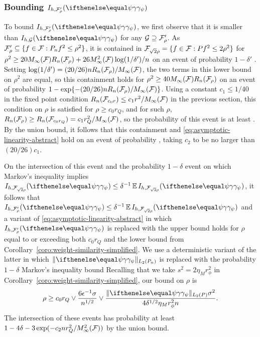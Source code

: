 \subsubsection{Bounding $I_{h,\F_{\rho}'}(\riesz[\psi])$} 
\label{sec:bounding-I}

To bound $I_{h,\F'_{\rho}}(\riesz[\psi])$, we first observe that it is smaller than $I_{h,\GG}(\riesz[\psi])$ 
for any $\mathcal{G} \supseteq \mathcal{F}'_{\rho}$. As $\F'_{\rho} \subseteq \set{ f \in \F : \Pn f^2 \le \rho^2}$, 
it is contained in $\F_{\sqrt{2}\rho} = \set{ f \in \F : \P f^2 \le 2\rho^2}$ 
for $\rho^2 \ge 20M_{\infty}(\mathcal{F})R_n(\mathcal{F}_{\rho}) + 26M_{\infty}^2(\mathcal{F})\log(1/\delta')/n$ on an event of probability $1-\delta'$ \citep[Lemma 3.6]{bartlett2005local}.
Setting $\log(1/\delta') = (20/26)nR_n(\mathcal{F}_{\rho})/M_{\infty}(\mathcal{F})$, the two terms in this lower bound on $\rho^2$ are equal,
so this containment holds for $\rho^2 \ge 40M_{\infty}(\mathcal{F})R_n(\mathcal{F}_{\rho})$
on an event of probability $1-\exp\{- (20/26)nR_n(\mathcal{F}_{\rho})/M_{\infty}(\mathcal{F})\}$.
Using a constant $c_1 \le 1/40$ in the fixed point condition $R_n(\mathcal{F}_{c_0r}) \le c_1 r^2/M_{\infty}(\mathcal{F})$ 
in the previous section, this condition on $\rho$ is satisfied for $\rho \ge c_0 r_Q$, and for such $\rho$,
$R_n(\mathcal{F}_{\rho}) \ge R_n(\mathcal{F}_{c_0 r_Q}) = c_1 r_Q^2 / M_{\infty}(\mathcal{F})$, so the probability of this event is
at least . By the union bound, it follows
that this containment and 
\eqref{eq:asymptotic-linearity-abstract} hold on an event of probability ,
taking $c_2$ to be no larger than $(20/26)c_1$.



On the intersection of this event and the probability $1-\delta$ event on which Markov's inequality implies 
$I_{h,\F_{\sqrt{2}\rho}}(\riesz[\psi]) \le \delta^{-1}\E I_{h,\F_{\sqrt{2}\rho}}(\riesz[\psi])$,
it follows that $I_{h,\F'_{\rho}}(\riesz[\psi]) \le  \delta^{-1}\E I_{h,\F_{\sqrt{2}\rho}}(\riesz[\psi])$
and a variant of \eqref{eq:asymptotic-linearity-abstract} in which 
$I_{h,\F'_{\rho}}(\riesz[\psi])$ is replaced with the upper bound  holds
 for $\rho$ equal to or exceeding both $c_0 r_Q$ and the lower bound from Corollary~\ref{coro:weight-similarity-simplified}.
We use a deterministic variant of the latter in which $\norm{\riesz[\psi]}_{L_2(\Pn)}$ is replaced with the probability $1-\delta$
Markov's inequality bound  Recalling that 
we take $s^2=2\eta_M r_{\phi}^2$ in Corollary~\ref{coro:weight-similarity-simplified}, our bound on $\rho$ is
\begin{equation}
\label{eq:rho-lb}
\rho \ge  c_0 r_Q \vee \frac{6 \epsilon^{-1} \sigma}{n^{1/2}} 
     \vee \frac{\norm{\riesz[\psi]}_{L_2(\P)} \sigma^2}{4\delta^{1/2} \eta_M r_\phi^2 n}.
\end{equation}
The intersection of these events has probability at least
$1-4\delta-3\exp(-c_2nr_Q^2/M_{\infty}^2(\mathcal{F}))$ by the union bound.


